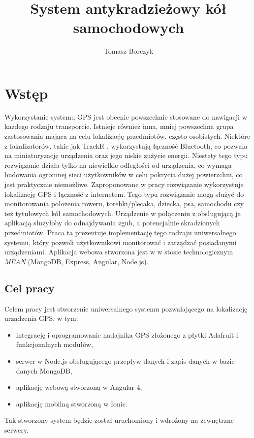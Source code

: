 \documentclass[eng,printmode]{mgr}
\title{System antykradzieżowy kół samochodowych}
\author{Tomasz Borczyk}
\begin{document}
\maketitle %
\tableofcontents


\chapter{Wstęp}
Wykorzystanie systemu GPS jest obecnie powszechnie stosowane do nawigacji w każdego rodzaju transporcie. Istnieje również inna, mniej powszechna grupa zastosowania mająca na celu lokalizację przedmiotów, często osobistych. Niektóre z lokalizatorów, takie jak TrackR \cite{TrackR}, wykorzystują łączność Bluetooth, co pozwala na miniaturyzację urządzenia oraz jego niskie zużycie energii. Niestety tego typu rozwiązanie działa tylko na niewielkie odległości od urządzenia, co wymaga budowania ogromnej sieci użytkowników w celu pokrycia dużej powierzchni, co jest praktycznie niemożliwe. Zaproponowane w pracy rozwiązanie wykorzystuje lokalizację GPS i łączność z internetem. Tego typu rozwiązanie mogą służyć do monitorowania położenia roweru, torebki/plecaka, dziecka, psa, samochodu czy też tytułowych kół samochodowych. Urządzenie w połączeniu z obsługującą je aplikacją służyłoby do odnajdywania zgub, a potencjalnie skradzionych przedmiotów. Praca ta prezentuje implementację tego rodzaju uniwersalnego systemu, który pozwoli użytkownikowi monitorować i zarządzać posiadanymi urządzeniami. Aplikacja webowa stworzona jest w w stosie technologicznym \textit{MEAN} (MongoDB, Express, Angular, Node.js).

\section{Cel pracy}
Celem pracy jest stworzenie uniwersalnego systemu pozwalającego na lokalizację urządzenia GPS, w tym:
\begin{itemize}
\item integrację i oprogramowanie nadajnika GPS złożonego z płytki Adafruit i funkcjonalnych modułów,
\item serwer w Node.js obsługującego przepływ danych i zapis danych w bazie danych MongoDB,
\item aplikację webową stworzoną w Angular 4,
\item aplikację mobilną stworzoną w Ionic.
\end{itemize}
Tak stworzony system będzie został uruchomiony i wdrożony na zewnętrzne serwery.
\end{document}

